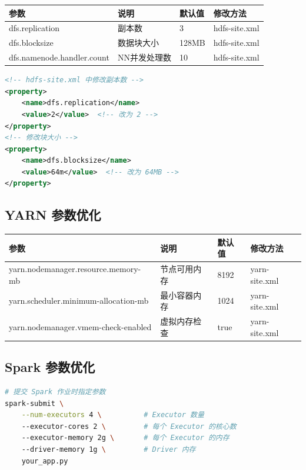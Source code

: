 \documentclass[12pt,a4paper]{article}
\begin{document}
{\footnotesize
\begin{table}[H]
\centering
\begin{tabular}{llll}
\toprule
\textbf{参数} & \textbf{说明} & \textbf{默认值} & \textbf{修改方法} \\
\midrule
dfs.replication & 副本数 & 3 & hdfs-site.xml \\
dfs.blocksize & 数据块大小 & 128MB & hdfs-site.xml \\
dfs.namenode.handler.count & NN并发处理数 & 10 & hdfs-site.xml \\
\bottomrule
\end{tabular}
\end{table}
}

\begin{lstlisting}[language=XML]
<!-- hdfs-site.xml 中修改副本数 -->
<property>
    <name>dfs.replication</name>
    <value>2</value>  <!-- 改为 2 -->
</property>
<!-- 修改块大小 -->
<property>
    <name>dfs.blocksize</name>
    <value>64m</value>  <!-- 改为 64MB -->
</property>
\end{lstlisting}

\subsection{YARN 参数优化}

{\footnotesize
\begin{table}[H]
\centering
\begin{tabular}{llll}
\toprule
\textbf{参数} & \textbf{说明} & \textbf{默认值} & \textbf{修改方法} \\
\midrule
yarn.nodemanager.resource.memory-mb & 节点可用内存 & 8192 & yarn-site.xml \\
yarn.scheduler.minimum-allocation-mb & 最小容器内存 & 1024 & yarn-site.xml \\
yarn.nodemanager.vmem-check-enabled & 虚拟内存检查 & true & yarn-site.xml \\
\bottomrule
\end{tabular}
\end{table}
}

\subsection{Spark 参数优化}

\begin{lstlisting}[language=bash]
# 提交 Spark 作业时指定参数
spark-submit \
    --num-executors 4 \          # Executor 数量
    --executor-cores 2 \         # 每个 Executor 的核心数
    --executor-memory 2g \       # 每个 Executor 的内存
    --driver-memory 1g \         # Driver 内存
    your_app.py
\end{lstlisting}
\end{document}
